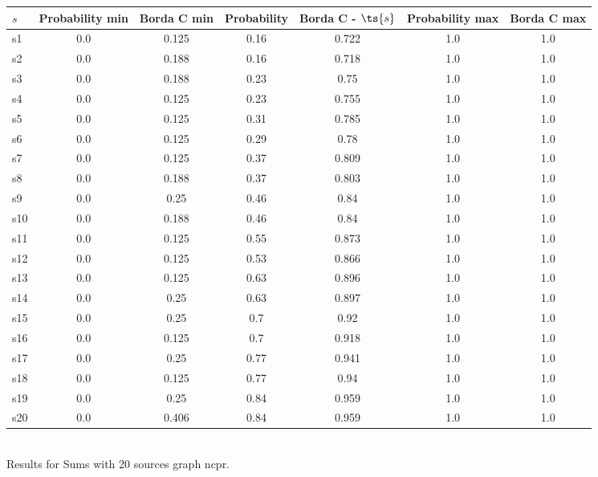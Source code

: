 \documentclass{article}
\begin{document}
\noindent\begin{tabular}{|l|c|c|c|c|c|c|}
\hline
$s$& Probability min & Borda C min & Probability & Borda C - $\ts{s}$ & Probability max & Borda C max\\
\hline
s1 &0.0 & 0.125 & 0.16 & 0.722 & 1.0 & 1.0\\
\hline
s2 &0.0 & 0.188 & 0.16 & 0.718 & 1.0 & 1.0\\
\hline
s3 &0.0 & 0.188 & 0.23 & 0.75 & 1.0 & 1.0\\
\hline
s4 &0.0 & 0.125 & 0.23 & 0.755 & 1.0 & 1.0\\
\hline
s5 &0.0 & 0.125 & 0.31 & 0.785 & 1.0 & 1.0\\
\hline
s6 &0.0 & 0.125 & 0.29 & 0.78 & 1.0 & 1.0\\
\hline
s7 &0.0 & 0.125 & 0.37 & 0.809 & 1.0 & 1.0\\
\hline
s8 &0.0 & 0.188 & 0.37 & 0.803 & 1.0 & 1.0\\
\hline
s9 &0.0 & 0.25 & 0.46 & 0.84 & 1.0 & 1.0\\
\hline
s10 &0.0 & 0.188 & 0.46 & 0.84 & 1.0 & 1.0\\
\hline
s11 &0.0 & 0.125 & 0.55 & 0.873 & 1.0 & 1.0\\
\hline
s12 &0.0 & 0.125 & 0.53 & 0.866 & 1.0 & 1.0\\
\hline
s13 &0.0 & 0.125 & 0.63 & 0.896 & 1.0 & 1.0\\
\hline
s14 &0.0 & 0.25 & 0.63 & 0.897 & 1.0 & 1.0\\
\hline
s15 &0.0 & 0.25 & 0.7 & 0.92 & 1.0 & 1.0\\
\hline
s16 &0.0 & 0.125 & 0.7 & 0.918 & 1.0 & 1.0\\
\hline
s17 &0.0 & 0.25 & 0.77 & 0.941 & 1.0 & 1.0\\
\hline
s18 &0.0 & 0.125 & 0.77 & 0.94 & 1.0 & 1.0\\
\hline
s19 &0.0 & 0.25 & 0.84 & 0.959 & 1.0 & 1.0\\
\hline
s20 &0.0 & 0.406 & 0.84 & 0.959 & 1.0 & 1.0\\
\hline
\end{tabular}\\

\noindent Results for Sums with 20 sources graph ncpr.
\end{document}
